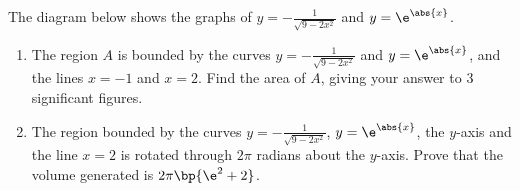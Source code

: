 \begin{problem}
    The diagram below shows the graphs of $y=-\frac{1}{\sqrt{9-2x^{2}}}$ and $y=\e^{\abs{x}}$.

    \begin{figure}[H]
        \centering
    \end{figure}

    \begin{enumerate}
        \item The region $A$ is bounded by the curves $y=-\frac{1}{\sqrt{9-2x^{2}}}$ and $y=\e^{\abs{x}}$, and the lines $x=-1$ and $x=2$. Find the area of $A$, giving your answer to 3 significant figures.
        \item The region bounded by the curves $y=-\frac{1}{\sqrt{9-2x^{2}}}$, $y=\e^{\abs{x}}$, the $y$-axis and the line $x=2$ is rotated through $2\pi$ radians about the $y$-axis. Prove that the volume generated is $2\pi\bp{\e^2 + 2}$.
    \end{enumerate}
\end{problem}

